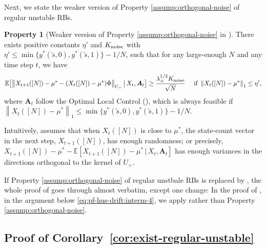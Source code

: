 \documentclass[11pt,letterpaper]{article}
\theoremstyle{plain}
\theoremstyle{definition}
\newtheorem{property}{Property}
\theoremstyle{remark}
\newcommand{\norm}[1]{\left\lVert#1\right\rVert}
\newcommand{\normbig}[1]{\big\lVert#1\big\rVert}
\newcommand{\Eplain}[1]{\mathbb{E}[#1]}
\newcommand{\Ebig}[1]{\mathbb{E}\big[#1\big]}
\newcommand{\givenplain}{\,|\,}
\newcommand{\givenbig}{\,\big|\,}
\newcommand{\ve}[1]{\bm{#1}}
\newcommand{\veA}{\ve{A}}
\newcommand{\statdist}{\mu^*}
\newcommand{\sneu}{\tilde{s}}
\newcommand{\radiusus}{\eta'}
\newcommand{\noiseortho}{K_{\textup{noise}}}
\newcommand{\subus}{+}%
\newcommand{\Uus}{U_{\subus}}
\newcommand{\lamus}{\lambda_{\subus}}
\begin{document}
Next, we state the weaker version of Property \ref{assump:orthogonal-noise} of regular unstable RBs.

\begin{property}[Weaker version of Property  \ref{assump:orthogonal-noise} in ]\label{assump:weak-orthogonal-noise}
    There exists positive constants $\radiusus$ and $\noiseortho$ with $\radiusus \leq \min\{y^*(\sneu, 0), y^*(\sneu, 1)\}-1/N$, such that for any large-enough $N$ and any time step $t$, we have
    \begin{equation*}
        \Ebig{\normbig{X_{t+1}([N]) - \statdist - (X_t([N])-\statdist)\Phi  }_{\Uus} \givenbig X_t, \veA_t} \geq \frac{\lamus^{1/2} \noiseortho}{\sqrt{N}} \quad \text{ if } \norm{X_t([N]) - \statdist}_1 \leq \radiusus,
    \end{equation*}
    where $\veA_t$ follow the Optimal Local Control (), which is always feasible if $\norm{X_t([N]) - \statdist}_1 \leq \min\{y^*(\sneu, 0), y^*(\sneu, 1)\}-1/N$.  
\end{property}

Intuitively,  assumes that when $X_t([N])$ is close to $\statdist$, the state-count vector in the next step, $X_{t+1}([N])$, has enough randomness; or precisely, $X_{t+1}([N]) - \statdist - \Eplain{X_{t+1}([N]) - \statdist \givenplain X_t, \veA_t}$ has enough variances in the directions orthogonal to the kernel of $\Uus$. 


If Property \ref{assump:orthogonal-noise} of regular unstbale RBs is replaced by , the whole proof of  goes through almost verbatim, except one change: In the proof of , in the argument below \eqref{eq:pf-hus-drift:interm-4}, we apply   rather than Property \ref{assump:orthogonal-noise}. 



\subsection{Proof of Corollary~\ref{cor:exist-regular-unstable}}\label{app:locally-unstable-example}  

\existregularunstable*
\end{document}
